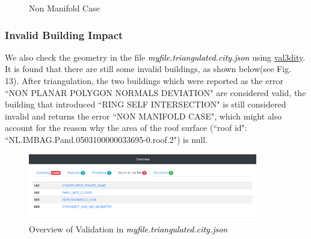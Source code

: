 \documentclass[12pt]{article}
\begin{document}
\begin{figure}[htbp]
\centering
{}
\caption{Non Manifold Case}
\end{figure}
\subsubsection*{Invalid Building Impact}
We also check the geometry in the file \textcolor{black}{\textit{myfile.triangulated.city.json}} using \href{http://geovalidation.bk.tudelft.nl/val3dity/}{val3dity}. It is found that there are still some invalid buildings, as shown below(see Fig. 13). After triangulation, the two buildings which were reported as the error ``NON PLANAR POLYGON NORMALS DEVIATION" are considered valid, the building that introduced ``RING SELF INTERSECTION" is still considered invalid and returns the error ``NON MANIFOLD CASE", which might also account for the reason why the area of the roof surface (``roof id": ``NL.IMBAG.Pand.0503100000033695-0.roof.2") is null.
\begin{figure}[htbp] 
\centering
\includegraphics[width=10cm]{overview of the validation report.PNG}
\caption{Overview of Validation in \textcolor{black}{\textit{myfile.triangulated.city.json}}}
\end{figure}
\end{document}
